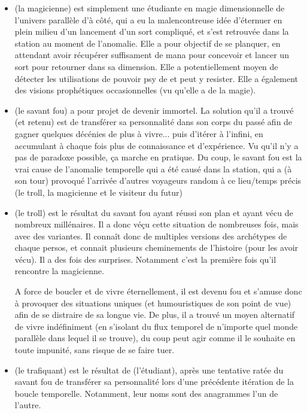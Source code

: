{\begin{itemize}
		\item \nmPlayerVI (la magicienne) est simplement une étudiante en magie dimensionnelle de l'univers parallèle d'à côté, qui a eu la malencontreuse idée d'éternuer en plein milieu d'un lancement d'un sort compliqué, et s'est retrouvée dans la station au moment de l'anomalie. Elle a pour objectif de se planquer, en attendant avoir récupérer suffisament de mana pour concevoir et lancer un sort pour retourner dans sa dimension. Elle a potentiellement moyen de détecter les utilisations de pouvoir psy de \nmPlayerIX et peut y resister. Elle a également des visions prophétiques occasionnelles (vu qu'elle a de la magie).
		
		\item \nmPlayerI (le savant fou) a pour projet de devenir immortel. La solution qu'il a trouvé (et retenu) est de transférer sa personnalité dans son corps du passé afin de gagner quelques décénies de plus à vivre... puis d'itérer à l'infini, en accumulant à chaque fois plus de connaissance et d'expérience. Vu qu'il n'y a pas de paradoxe possible, ça marche en pratique. Du coup, le savant fou est la vrai cause de l'anomalie temporelle qui a été causé dans la station, qui a (à son tour) provoqué l'arrivée d'autres voyageurs random à ce lieu/temps précis (le troll, la magicienne et le visiteur du futur)
		
		\item \nmPlayerIV (le troll) est le résultat du savant fou ayant réussi son plan et ayant vécu de nombreux millénaires. Il a donc véçu cette situation de nombreuses fois, mais avec des variantes. Il connaît donc de multiples versions des archétypes de chaque persos, et connait plusieurs cheminements de l'histoire (pour les avoir vécu). Il a des fois des surprises. Notamment c'est la première fois qu'il rencontre la magicienne.
		
		A force de boucler et de vivre éternellement, il est devenu fou et s'amuse donc à provoquer des situations uniques (et humouristiques de son point de vue) afin de se distraire de sa longue vie. De plus, il a trouvé un moyen alternatif de vivre indéfiniment (en s'isolant du flux temporel de n'importe quel monde parallèle dans lequel il se trouve), du coup peut agir comme il le souhaite en toute impunité, sans risque de se faire tuer.
		
		\item \nmPlayerII (le trafiquant) est le résultat de \nmPlayerIII (l'étudiant), après une tentative ratée du savant fou de transférer sa personnalité lors d'une précédente itération de la boucle temporelle. Notamment, leur noms sont des anagrammes l'un de l'autre.
		

\end{itemize}}
